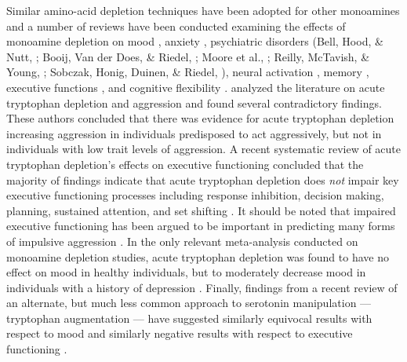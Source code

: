 Similar amino-acid depletion techniques have been adopted for other monoamines and a number of reviews have been conducted examining the effects of monoamine depletion on mood \parencite{Ruhe2007, Vanderdoes2001}, anxiety \parencite{Anderson1999}, psychiatric disorders (Bell, Hood, \& Nutt, \citeyear{Bell2005}; Booij, Van der Does, \& Riedel, \citeyear{Booij03}; Moore et al., \citeyear{Moore2002}; Reilly, McTavish, \& Young, \citeyear{Reilly1997}; Sobczak, Honig, Duinen, \& Riedel, \citeyear{Sobczak2002}), neural activation \parencite{Fusar2006}, memory \parencite{Sambeth2007}, executive functions \parencite{Mendelsohn2009}, and cognitive flexibility \parencite{Evers2007}. \citeauthor{Booij03} analyzed the literature on acute tryptophan depletion and  aggression and found several contradictory findings. These authors concluded that there was evidence for acute tryptophan depletion increasing aggression in individuals predisposed to act aggressively, but not in individuals with low trait levels of aggression. A recent systematic review of acute tryptophan depletion's effects on executive functioning concluded that the majority of findings indicate that acute tryptophan depletion does \emph{not} impair key executive functioning processes including response inhibition, decision making, planning, sustained attention, and set shifting \parencite{Mendelsohn2009}. It should be noted that impaired executive functioning has been argued to be important in predicting many forms of impulsive aggression \parencite[e.g.,][]{Hancock2010}. In the only relevant meta-analysis conducted on monoamine depletion studies, acute tryptophan depletion was found to have no effect on mood in healthy individuals, but to moderately decrease mood in individuals with a history of depression \parencite{Ruhe2007}. Finally, findings from a recent review of an alternate, but much less common approach to serotonin manipulation --- tryptophan augmentation --- have suggested similarly equivocal results with respect to mood and similarly negative results with respect to executive functioning \parencite{Silber2010}.
